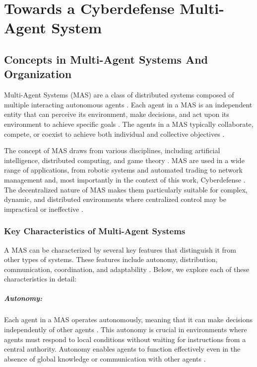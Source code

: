 \chapter{Towards a Cyberdefense Multi-Agent System}\label{ch:introduction}

\section{Concepts in Multi-Agent Systems And Organization}

Multi-Agent Systems (MAS) are a class of distributed systems composed of multiple interacting autonomous agents \cite{wooldridge2009introduction}. Each agent in a MAS is an independent entity that can perceive its environment, make decisions, and act upon its environment to achieve specific goals \cite{ferber1999multi}. The agents in a MAS typically collaborate, compete, or coexist to achieve both individual and collective objectives \cite{weiss1999multiagent}.

The concept of MAS draws from various disciplines, including artificial intelligence, distributed computing, and game theory \cite{shoham2008multiagent}. MAS are used in a wide range of applications, from robotic systems and automated trading to network management and, most importantly in the context of this work, Cyberdefense \cite{jennings1998applications, shakarian2015cyber}. The decentralized nature of MAS makes them particularly suitable for complex, dynamic, and distributed environments where centralized control may be impractical or ineffective \cite{sycara1998multiagent}.

\subsection{Key Characteristics of Multi-Agent Systems}

A MAS can be characterized by several key features that distinguish it from other types of systems. These features include autonomy, distribution, communication, coordination, and adaptability \cite{wooldridge2009introduction}. Below, we explore each of these characteristics in detail:

\paragraph{Autonomy:}
Each agent in a MAS operates autonomously, meaning that it can make decisions independently of other agents \cite{jennings1998roadmap}. This autonomy is crucial in environments where agents must respond to local conditions without waiting for instructions from a central authority. Autonomy enables agents to function effectively even in the absence of global knowledge or communication with other agents \cite{russell2016artificial}.

